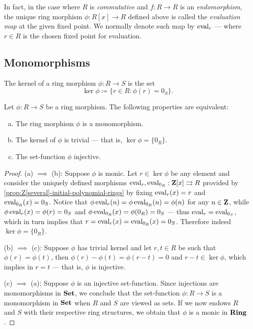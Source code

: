 In fact, in the case where \(R\) is \emph{commutative} and \(f: R \to R\) is an
\emph{endomorphism}, the unique ring morphism \(\phi: R[x] \to R\) defined above
is called the \emph{evaluation map} at the given fixed point. We normally denote
such map by \(\operatorname{eval}_r\) --- where \(r \in R\) is the chosen fixed point for
evaluation.

\subsection{Monomorphisms}

%
\begin{definition}[Kernel]
\label{def:ring-morphism-kernel}
The kernel of a ring morphism \(\phi: R \to S\) is the set
\[
\ker \phi \coloneq \{r \in R \colon \phi(r) = 0_S\}.
\]
\end{definition}
%

%
\begin{proposition}
\label{prop:ring-kernel-monomorphism-injective}
Let \(\phi: R \to S\) be a ring morphism. The following properties are
equivalent:
\begin{enumerate}[(a)]\setlength\itemsep{0em}
\item The ring morphism \(\phi\) is a monomorphism.

\item The kernel of \(\phi\) is trivial --- that is, \(\ker \phi = \{0_R\}\).

\item The set-function \(\phi\) injective.
\end{enumerate}
\end{proposition}
%

%
\begin{proof}
(a) \(\implies\) (b): Suppose \(\phi\) is monic. Let \(r \in \ker \phi\) be any
element and consider the uniquely defined morphisms
\(\operatorname{eval}_r, \operatorname{eval}_{0_R}: \mathbf{Z}[x] \rightrightarrows R\) provided by
\cref{prop:Z[several]-initial-polynomial-rings} by fixing \(\operatorname{eval}_r(x) = r\) and
\(\operatorname{eval}_{0_R}(x) = 0_S\). Notice that
\(\phi \operatorname{eval}_r(n) = \phi \operatorname{eval}_{0_R}(n) = \phi(n)\) for any \(n \in \mathbf{Z}\), while
\(\phi \operatorname{eval}_r(x) = \phi(r) = 0_S\) and
\(\phi \operatorname{eval}_{0_R}(x) = \phi(0_R) = 0_S\) --- thus \(\operatorname{eval}_r = \operatorname{eval}_{0_S}\),
which in turn implies that \(r = \operatorname{eval}_r(x) = \operatorname{eval}_{0_R}(x) = 0_S\). Therefore
indeed \(\ker \phi = \{0_R\}\).

(b) \(\implies\) (c): Suppose \(\phi\) has trivial kernel and let \(r, t \in R\)
be such that \(\phi(r) = \phi(t)\), then \(\phi(r) - \phi(t) = \phi(r - t) = 0\)
and \(r - t \in \ker \phi\), which implies in \(r = t\) --- that is, \(\phi\) is
injective.

(c) \(\implies\) (a): Suppose \(\phi\) is an injective set-function. Since
injections are monomorphisms in \({\textbf{Set}}\), we conclude that the set-function
\(\phi: R \to S\) is a monomorphism in \({\textbf{Set}}\) when \(R\) and \(S\) are viewed
as sets. If we now endows \(R\) and \(S\) with their respective ring structures,
we obtain that \(\phi\) is a monic in \({\textbf{Ring}}\).
\end{proof}
%

